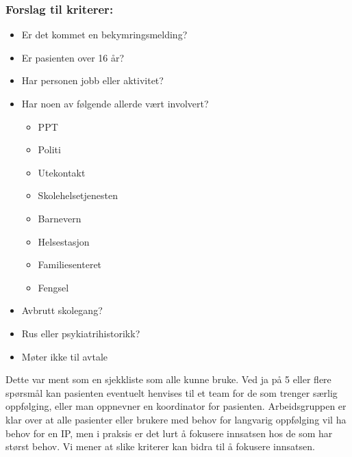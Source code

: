 \documentclass[11pt]{report} %
\begin{document}
                    \subsubsection{Forslag til kriterer:}
                      \begin{itemize}
                        \item Er det kommet en bekymringsmelding?\\
                        \item Er pasienten over 16 år?\\
                        \item Har personen jobb eller aktivitet?\\
                        \item Har noen av følgende allerde vært involvert?
                          \begin{itemize}
                            \item PPT\\
                            \item Politi\\
                            \item Utekontakt\\
                            \item Skolehelsetjenesten\\
                            \item Barnevern\\
                            \item Helsestasjon\\
                            \item Familiesenteret\\
                            \item Fengsel\\
                          \end{itemize}
                        \item Avbrutt skolegang?\\
                        \item Rus eller psykiatrihistorikk?\\
                        \item Møter ikke til avtale\\
                      \end{itemize}
                    Dette var ment som en sjekkliste som alle kunne bruke. Ved ja på 5 eller flere spørsmål kan pasienten eventuelt henvises til et team for de som trenger særlig oppfølging, eller man oppnevner en koordinator for pasienten. Arbeidsgruppen er klar over at alle pasienter eller brukere med behov for langvarig oppfølging vil ha behov for en IP, men i praksis er det lurt å fokusere innsatsen hos de som har størst behov. Vi mener at slike kriterer kan bidra til å fokusere innsatsen.\\
\end{document}
